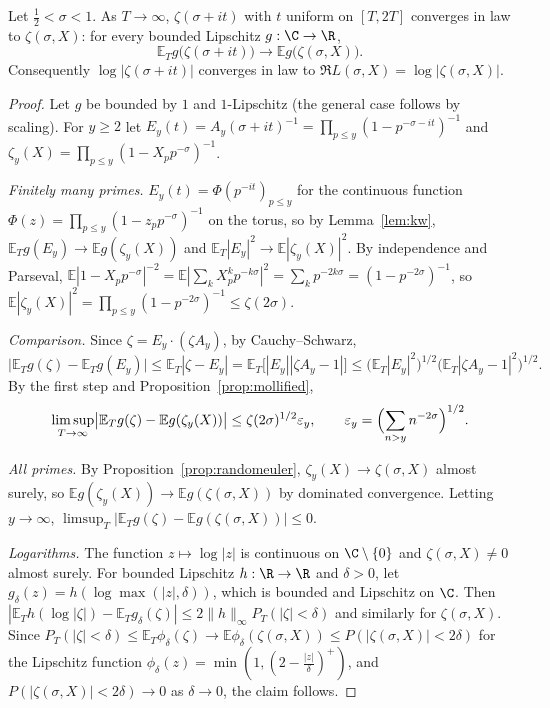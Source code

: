 \begin{theorem}\label{thm:bohrjessen}
Let $\frac12<\sigma<1$. As $T\to\infty$, $\zeta(\sigma+it)$ with $t$ uniform on $[T,2T]$ converges in law to $\zeta(\sigma,X)$: for every bounded Lipschitz $g:\C\to\R$,
\[
\mathbb E_Tg\bigl(\zeta(\sigma+it)\bigr)\longrightarrow\mathbb Eg\bigl(\zeta(\sigma,X)\bigr).
\]
Consequently $\log|\zeta(\sigma+it)|$ converges in law to $\Re L(\sigma,X)=\log|\zeta(\sigma,X)|$.
\end{theorem}
\begin{proof}
Let $g$ be bounded by $1$ and $1$-Lipschitz (the general case follows by scaling). For $y\ge2$ let $E_y(t)=A_y(\sigma+it)^{-1}=\prod_{p\le y}(1-p^{-\sigma-it})^{-1}$ and $\zeta_y(X)=\prod_{p\le y}(1-X_pp^{-\sigma})^{-1}$.

\emph{Finitely many primes.} $E_y(t)=\Phi(p^{-it})_{p\le y}$ for the continuous function $\Phi(z)=\prod_{p\le y}(1-z_pp^{-\sigma})^{-1}$ on the torus, so by Lemma~\ref{lem:kw}, $\mathbb E_Tg(E_y)\to\mathbb Eg(\zeta_y(X))$ and $\mathbb E_T|E_y|^2\to\mathbb E|\zeta_y(X)|^2$. By independence and Parseval, $\mathbb E|1-X_pp^{-\sigma}|^{-2}=\mathbb E|\sum_kX_p^kp^{-k\sigma}|^2=\sum_kp^{-2k\sigma}=(1-p^{-2\sigma})^{-1}$, so $\mathbb E|\zeta_y(X)|^2=\prod_{p\le y}(1-p^{-2\sigma})^{-1}\le\zeta(2\sigma)$.

\emph{Comparison.} Since $\zeta=E_y\cdot(\zeta A_y)$, by Cauchy--Schwarz,
\[
\bigl|\mathbb E_Tg(\zeta)-\mathbb E_Tg(E_y)\bigr|\le\mathbb E_T|\zeta-E_y|=\mathbb E_T\bigl[|E_y||\zeta A_y-1|\bigr]\le\bigl(\mathbb E_T|E_y|^2\bigr)^{1/2}\bigl(\mathbb E_T|\zeta A_y-1|^2\bigr)^{1/2}.
\]
By the first step and Proposition~\ref{prop:mollified},
\[
\limsup_{T\to\infty}\bigl|\mathbb E_Tg(\zeta)-\mathbb Eg(\zeta_y(X))\bigr|\le\zeta(2\sigma)^{1/2}\varepsilon_y,\qquad\varepsilon_y=\Bigl(\sum_{n>y}n^{-2\sigma}\Bigr)^{1/2}.
\]

\emph{All primes.} By Proposition~\ref{prop:randomeuler}, $\zeta_y(X)\to\zeta(\sigma,X)$ almost surely, so $\mathbb Eg(\zeta_y(X))\to\mathbb Eg(\zeta(\sigma,X))$ by dominated convergence. Letting $y\to\infty$, $\limsup_T|\mathbb E_Tg(\zeta)-\mathbb Eg(\zeta(\sigma,X))|\le0$.

\emph{Logarithms.} The function $z\mapsto\log|z|$ is continuous on $\C\setminus\{0\}$ and $\zeta(\sigma,X)\ne0$ almost surely. For bounded Lipschitz $h:\R\to\R$ and $\delta>0$, let $g_\delta(z)=h(\log\max(|z|,\delta))$, which is bounded and Lipschitz on $\C$. Then $|\mathbb E_Th(\log|\zeta|)-\mathbb E_Tg_\delta(\zeta)|\le2\|h\|_\infty P_T(|\zeta|<\delta)$ and similarly for $\zeta(\sigma,X)$. Since $P_T(|\zeta|<\delta)\le\mathbb E_T\phi_\delta(\zeta)\to\mathbb E\phi_\delta(\zeta(\sigma,X))\le P(|\zeta(\sigma,X)|<2\delta)$ for the Lipschitz function $\phi_\delta(z)=\min(1,(2-\frac{|z|}\delta)^+)$, and $P(|\zeta(\sigma,X)|<2\delta)\to0$ as $\delta\to0$, the claim follows.
\end{proof}

